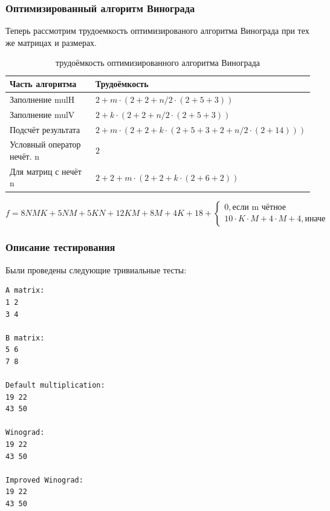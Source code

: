 \documentclass[12pt,a4paper]{article}
\numberwithin{equation}{section}
\begin{document}
\subsubsection{Оптимизированный алгоритм Винограда}
Теперь рассмотрим трудоемкость оптимизированого алгоритма Винограда при тех же матрицах и размерах. 
\begin{table}[h]
  \label{tabular:timesandtenses}
\begin{center}
\begin{tabular}{  l  l  }
        Часть алгоритма               & Трудоёмкость                                                            \\ \hline
        Заполнение mulH               & $2 + m \cdot (2 + 2 + n / 2 \cdot (2 + 5 + 3))$                         \\ 
        Заполнение mulV               & $2 + k \cdot (2 + 2 + n / 2 \cdot (2 + 5 + 3))$                         \\ 
        Подсчёт результата            & $2 + m \cdot (2 + 2 + k \cdot (2 + 5 + 3 + 2  + n / 2 \cdot (2 + 14)))$                                             \\ 
        Условный оператор нечёт. n   & $2$                                                                     \\
        Для матриц с нечёт n          & $2 + 2 + m \cdot (2 + 2 + k \cdot (2 + 6 + 2))$                         \\ 
\end{tabular}
\caption{трудоёмкость оптимизированного алгоритма Винограда}
\end{center}
\end{table}
\begin{displaymath}
    f = 8NMK + 5NM + 5KN + 12KM + 8M + 4K + 18 + \left \{ 
    \begin{array}{ll}  
        0, \textrm{если m чётное} \\ 
        10 \cdot K \cdot M + 4 \cdot M + 4, \textrm{иначе} 
    \end{array} \right.
\end{displaymath}

\subsubsection{Описание тестирования} %
Были проведены следующие тривиальные тесты:\\
\begin{lstlisting}[label=some-code,caption= Число строк равно числу стобцов]
A matrix:
1 2 
3 4

B matrix:
5 6
7 8  

Default multiplication:  
19 22
43 50

Winograd:
19 22
43 50

Improved Winograd:
19 22
43 50
\end{lstlisting}
\end{document}
